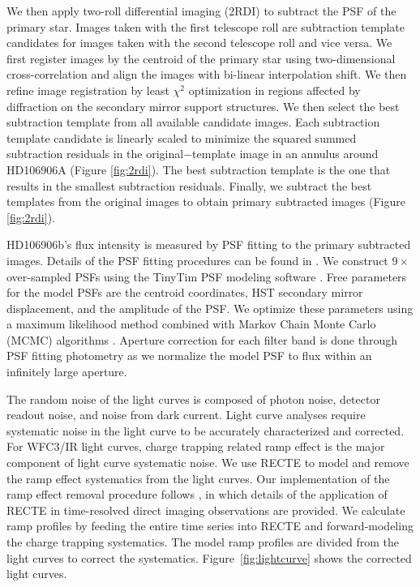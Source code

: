 \documentclass[twocolumn]{aastex62}
\begin{document}
We then apply two-roll differential imaging (2RDI) to subtract the PSF of the primary star.  Images taken with the first telescope roll are subtraction template candidates for images taken with the second telescope roll and vice versa. We first register images by the centroid of the primary star using two-dimensional cross-correlation and align the images with bi-linear interpolation shift. We then  refine image registration by least $\chi^{2}$ optimization in regions affected by diffraction on the secondary mirror support structures. We then select the best subtraction template from all available candidate images.  Each subtraction template candidate is linearly scaled to minimize the squared summed subtraction residuals in the original$-$template image in an annulus around HD106906A (Figure \ref{fig:2rdi}). The best subtraction template is the one that results in the smallest subtraction residuals. Finally, we subtract the best templates from the original images to obtain primary subtracted images (Figure \ref{fig:2rdi}). 

HD106906b's flux intensity is measured by PSF fitting to the primary subtracted images. Details of the PSF fitting procedures can be found in \citet{Zhou2019}. We construct $9\times$ over-sampled PSFs using the TinyTim PSF modeling software \citep{Krist1995}. Free parameters for the model PSFs are the centroid coordinates, HST secondary mirror displacement, and the amplitude of the PSF. We optimize these parameters using a maximum likelihood method combined with Markov Chain Monte Carlo (MCMC) algorithms \citep[MCMC performed by \texttt{emcee},][]{Foreman-Mackey2012}. Aperture correction for each filter band is done through PSF fitting photometry as we normalize the model PSF to flux within an infinitely large aperture. 

The random noise of the light curves is composed of  photon noise, detector readout noise, and noise from dark current. Light curve analyses require systematic noise in the light curve to be accurately characterized and corrected. For WFC3/IR light curves, charge trapping related ramp effect is the major component of light curve systematic noise. We use RECTE \citep{Zhou2017} to model and remove the ramp effect systematics from the light curves. Our implementation of the ramp effect removal procedure follows \citet{Zhou2019}, in which details of the application of RECTE in time-resolved direct imaging observations are provided. We calculate ramp profiles by feeding the entire time series into RECTE and forward-modeling the charge trapping systematics. The model ramp profiles are divided from the light curves to correct the systematics. Figure~\ref{fig:lightcurve} shows the corrected light curves.
\end{document}
